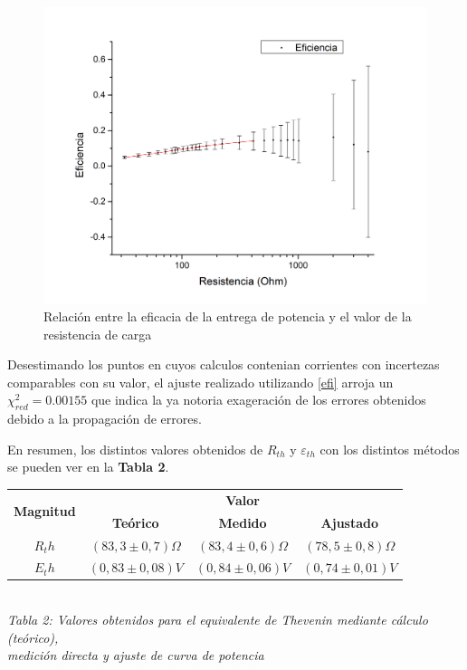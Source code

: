 \documentclass[11pt,a4paper]{article}
\begin{document}
\begin{figure}[h]
  \centering
  \includegraphics[scale=0.4]{Eficiencia_vs_Resistencia}
  \caption{Relación entre la eficacia de la entrega de potencia y el valor de la resistencia de carga}
  \label{fig:efi_res}
\end{figure}

Desestimando los puntos en cuyos calculos contenian corrientes con incertezas comparables con su valor, el ajuste realizado utilizando \eqref{efi} arroja un $\chi_{red}^{2} = 0.00155$ que indica la ya notoria exageración de los errores obtenidos debido a la propagación de errores.  

En resumen, los distintos valores obtenidos de $R_{th}$ y $\varepsilon_{th}$ con los distintos métodos se pueden ver en la \textbf{Tabla 2}.

\begin{center}
\begin{tabular}{||c|c|c|c||}
\hline
\multirow{2}{*}{\textbf{Magnitud}} & \multicolumn{3}{c||}{\textbf{Valor}} \\ \cline{2-4}
  & \textbf{Teórico} & \textbf{Medido} & \textbf{Ajustado} \\ \hline
$R_th$ & $(83,3\pm0,7)\Omega$ & $(83,4\pm0,6)\Omega$ & $(78,5\pm0,8)\Omega$ \\ \hline
$E_th$ & $(0,83\pm0,08)V$ & $(0,84\pm0,06)V$ & $(0,74\pm0,01)V$ \\ \hline
\end{tabular}\\[0.3cm]
\textit{Tabla 2: Valores obtenidos para el equivalente de Thevenin mediante cálculo (teórico),\\ medición directa y ajuste de curva de potencia}
\end{center}
\end{document}
